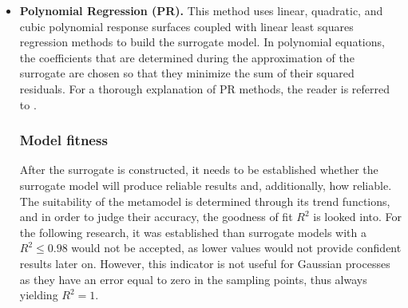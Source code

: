 \documentclass[12pt,number,preprint,review,times]{elsarticle}
\begin{document}
\begin{itemize}


\item \textbf{Polynomial Regression (PR).} This method uses linear, quadratic, and cubic polynomial response surfaces coupled with linear least squares regression methods to build the surrogate model. In polynomial equations, the coefficients that are determined during the approximation of the surrogate are chosen so that they minimize the sum of their squared residuals. For a thorough explanation of PR methods, the reader is referred to \citet{neter1996applied}. 



\subsubsection{Model fitness}

After the surrogate is constructed, it needs to be established whether the surrogate model will produce reliable results and, additionally, how reliable. The suitability of the metamodel is determined through its trend functions, and in order to judge their accuracy, the goodness of fit $R^2$ is looked into. For the following research, it was established than surrogate models with a $R^2 \leqslant 0.98$ would not be accepted, as lower values would not provide confident results later on. However, this indicator is not useful for Gaussian processes as they have an error equal to zero in the sampling points, thus always yielding $R^2 = 1$.


\end{itemize}
\end{document}
